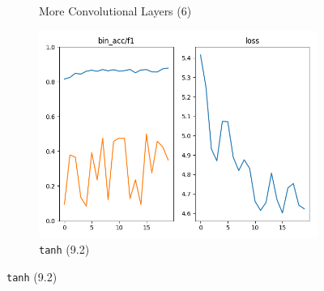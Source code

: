 \begin{frame}
\begin{figure}
\begin{subfigure}{0.5\textwidth}
			\caption{More Convolutional Layers (6)}
		\end{subfigure}%
		\begin{subfigure}{0.5\textwidth}
			\centering
			\includegraphics[width=0.8\linewidth]{images/relu_to_tanh.png}
			\caption{\texttt{tanh} (9.2)}
		\end{subfigure}
	\end{figure}
\end{frame}
